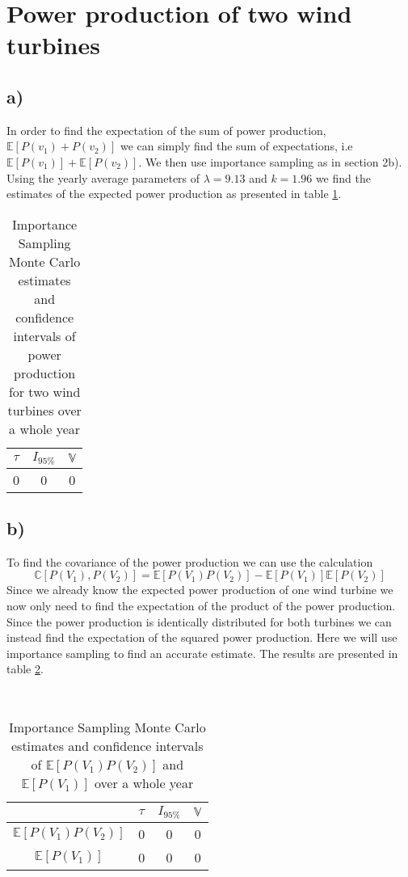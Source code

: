 \documentclass[a4paper]{article}
\begin{document}
\newpage
\section*{Power production of two wind turbines}

\subsection*{a)}
In order to find the expectation of the sum of power production, $\mathbb{E}[P(v_1) + P(v_2)]$ we can simply find the sum of expectations, i.e $\mathbb{E}[P(v_1)] + \mathbb{E}[P(v_2)]$. We then use importance sampling as in section 2b). Using the yearly average parameters of $\lambda = 9.13$ and $k = 1.96$ we find the estimates of the expected power production as presented in table \ref{IS2results}.


\begin{table}
    \centering
    \caption{Importance Sampling Monte Carlo estimates and confidence intervals of power production for two wind turbines over a whole year}
    \label{IS2results}
    \begin{tabular}{| c c c ||}
        \hline
        $\tau$ & $I_{95\%}$ & $\mathbb{V}$ \\
        \hline\hline
        0 & 0 & 0 \\
        \hline
    \end{tabular}
\end{table}

\subsection*{b)}
To find the covariance of the power production we can use the calculation
\begin{equation}
     \mathbb{C}[P(V_1), P(V_2)] = \mathbb{E}[P(V_1)P(V_2)] - \mathbb{E}[P(V_1)]\mathbb{E}[P(V_2)]
\end{equation}
Since we already know the expected power production of one wind turbine we now only need to find the expectation of the product of the power production. Since the power production is identically distributed for both turbines we can instead find the expectation of the squared power production. Here we will use importance sampling to find an accurate estimate. The results are presented in table \ref{Covresults}.

\\



\begin{table}
    \centering
    \caption{Importance Sampling Monte Carlo estimates and confidence intervals of $\mathbb{E}[P(V_1)P(V_2)]$ and $\mathbb{E}[P(V_1)]$ over a whole year}
    \label{Covresults}
    \begin{tabular}{|c|| c c c ||}
        \hline
        & $\tau$ & $I_{95\%}$ & $\mathbb{V}$ \\
        \hline\hline
        $\mathbb{E}[P(V_1)P(V_2)]$ & 0 & 0 & 0 \\
        \hline
        $\mathbb{E}[P(V_1)]$ & 0 & 0 & 0 \\
        \hline
    \end{tabular}
\end{table}
\end{document}
